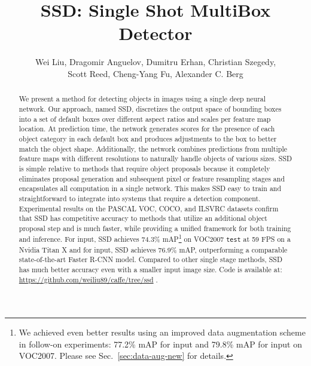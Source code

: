 \documentclass[runningheads]{llncs}
\def\etal{\emph{et al.}}
\begin{document}
\pagestyle{headings}
\mainmatter


\def\httilde{\mbox{\tt\raisebox{-.5ex}{\symbol{126}}}}

\newcommand{\specialcell}[2][c]{\begin{tabular}[#1]{@{}l@{}}#2\end{tabular}}

\title{SSD: Single Shot MultiBox Detector}


\authorrunning{Liu \etal}


\author{Wei Liu, Dragomir Anguelov, Dumitru Erhan, Christian Szegedy,\\Scott Reed, Cheng-Yang Fu, Alexander C. Berg}

\maketitle

\begin{abstract}
We present a method for detecting objects in images using a single deep neural network. Our approach, named SSD, discretizes the output space of bounding boxes into a set of default boxes over different aspect ratios and scales per feature map location. At prediction time, the network generates scores for the presence of each object category in each default box and produces adjustments to the box to better match the object shape. Additionally, the network combines predictions from multiple feature maps with different resolutions to naturally handle objects of various sizes. SSD is simple relative to methods that require object proposals because it completely eliminates proposal generation and subsequent pixel or feature resampling stages and encapsulates all computation in a single network. This makes SSD easy to train and straightforward to integrate into systems that require a detection component. Experimental results on the PASCAL VOC, COCO, and ILSVRC datasets confirm that SSD has competitive accuracy to methods that utilize an additional object proposal step and is much faster, while providing a unified framework for both training and inference. For  input, SSD achieves 74.3\% mAP\footnote{We achieved even better results using an improved data augmentation scheme in follow-on experiments: 77.2\% mAP for  input and 79.8\% mAP for  input on VOC2007. Please see Sec.~\ref{sec:data-aug-new} for details.} on VOC2007 \texttt{test} at 59 FPS on a Nvidia Titan X and for  input, SSD achieves 76.9\% mAP, outperforming a comparable state-of-the-art Faster R-CNN model. Compared to other single stage methods, SSD has much better accuracy even with a smaller input image size. Code is available at: \url{https://github.com/weiliu89/caffe/tree/ssd} .
\end{abstract}
\end{document}
